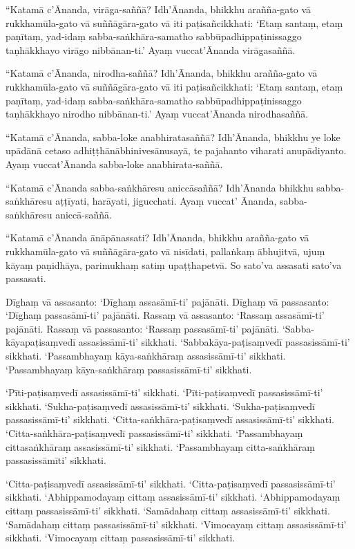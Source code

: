 “Katamā c’Ānanda, virāga-saññā? Idh’Ānanda, bhikkhu arañña-gato vā
rukkhamūla-gato vā suññāgāra-gato vā iti paṭisañcikkhati: ‘Etaṃ santaṃ, etaṃ
paṇītaṃ, yad-idaṃ sabba-saṅkhāra-samatho sabbūpadhippaṭinissaggo taṇhākkhayo
virāgo nibbānan-ti.’ Ayaṃ vuccat’Ānanda virāgasaññā.

“Katamā c’Ānanda, nirodha-saññā? Idh’Ānanda, bhikkhu arañña-gato vā
rukkhamūla-gato vā suññāgāra-gato vā iti paṭisañcikkhati: ‘Etaṃ santaṃ, etaṃ
paṇītaṃ, yad-idaṃ sabba-saṅkhāra-samatho sabbūpadhippaṭinissaggo taṇhākkhayo
nirodho nibbānan-ti.’ Ayaṃ vuccat’Ānanda nirodhasaññā.

“Katamā c’Ānanda, sabba-loke anabhiratasaññā? Idh’Ānanda, bhikkhu ye loke
upādānā cetaso adhiṭṭhānābhinivesānusayā, te pajahanto viharati anupādiyanto.
Ayaṃ vuccat’Ānanda sabba-loke anabhirata-saññā.

“Katamā c’Ānanda sabba-saṅkhāresu aniccāsaññā? Idh’Ānanda bhikkhu
sabba-saṅkhāresu aṭṭīyati, harāyati, jigucchati. Ayaṃ vuccat’ Ānanda,
sabba-saṅkhāresu aniccā-saññā.

“Katamā c’Ānanda ānāpānassati?
Idh’Ānanda, bhikkhu arañña-gato vā rukkhamūla-gato vā suññāgāra-gato vā nisīdati,
pallaṅkaṃ ābhujitvā, ujuṃ kāyaṃ paṇidhāya,
parimukhaṃ satiṃ upaṭṭhapetvā. So sato’va
assasati sato’va passasati.

Dīghaṃ vā assasanto: ‘Dīghaṃ assasāmī-ti’ pajānāti. Dīghaṃ vā passasanto:
‘Dīghaṃ passasāmī-ti’ pajānāti. Rassaṃ vā assasanto: ‘Rassaṃ assasāmī-ti’
pajānāti. Rassaṃ vā passasanto: ‘Rassaṃ passasāmī-ti’ pajānāti.
‘Sabba-kāyapaṭisaṃvedī assasissāmī-ti’ sikkhati. ‘Sabbakāya-paṭisaṃvedī
passasissāmī-ti’ sikkhati. ‘Passambhayaṃ kāya-saṅkhāraṃ assasissāmī-ti’
sikkhati. ‘Passambhayaṃ kāya-saṅkhāraṃ passasissāmī-ti’ sikkhati.

‘Pīti-paṭisaṃvedī assasissāmī-ti’ sikkhati. ‘Pīti-paṭisaṃvedī passasissāmī-ti’
sikkhati. ‘Sukha-paṭisaṃvedī assasissāmī-ti’ sikkhati. ‘Sukha-paṭisaṃvedī
passasissāmī-ti’ sikkhati. ‘Citta-saṅkhāra-paṭisaṃvedī assasissāmī-ti’ sikkhati.
‘Citta-saṅkhāra-paṭisaṃvedī passasissāmī-ti’ sikkhati. ‘Passambhayaṃ
cittasaṅkhāraṃ assasissāmī-ti’ sikkhati. ‘Passambhayaṃ citta-saṅkhāraṃ
passasissāmīti’ sikkhati.

‘Citta-paṭisaṃvedī assasissāmī-ti’ sikkhati. ‘Citta-paṭisaṃvedī passasissāmī-ti’
sikkhati. ‘Abhippamodayaṃ cittaṃ assasissāmī-ti’ sikkhati. ‘Abhippamodayaṃ
cittaṃ passasissāmī-ti’ sikkhati. ‘Samādahaṃ cittaṃ assasissāmī-ti’ sikkhati.
‘Samādahaṃ cittaṃ passasissāmī-ti’ sikkhati. ‘Vimocayaṃ cittaṃ assasissāmī-ti’
sikkhati. ‘Vimocayaṃ cittaṃ passasissāmī-ti’ sikkhati.

